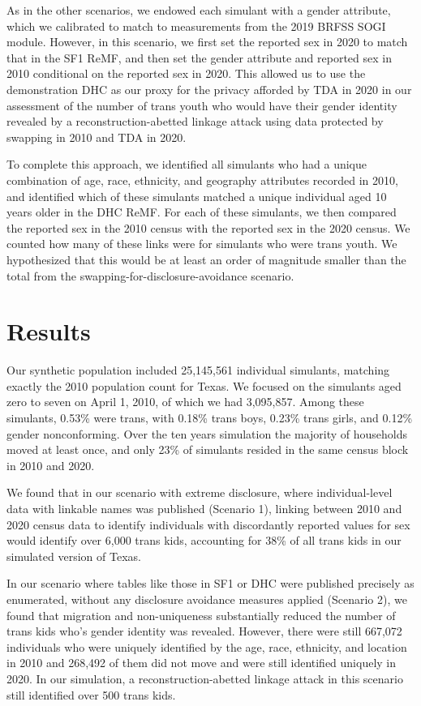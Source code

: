 \documentclass{jpc} %
\theoremstyle{plain}\newtheorem{satz}[thm]{Satz} %
\begin{document}
As in the other scenarios, we endowed each simulant with a gender attribute, which we calibrated to match to measurements from the 2019 BRFSS SOGI module. However, in this scenario, we first set the reported sex in 2020 to match that in the SF1 ReMF, and then set the gender attribute and reported sex in 2010 conditional on the reported sex in 2020.  This allowed us to use the demonstration DHC as our proxy for the privacy afforded by TDA in 2020 in our assessment of the number of trans youth who would have their gender identity revealed by a reconstruction-abetted linkage attack using data protected by swapping in 2010 and TDA in 2020.

To complete this approach, we identified all simulants who had a unique combination of age, race, ethnicity, and geography attributes recorded in 2010, and identified which of these simulants matched a unique individual aged 10 years older in the DHC ReMF.  For each of these simulants, we then compared the reported sex in the 2010 census with the reported sex in the 2020 census. We counted how many of these links were for simulants who were trans youth.  We hypothesized that this would be at least an order of magnitude smaller than the total from the swapping-for-disclosure-avoidance scenario.

\section*{Results}

Our synthetic population included 25,145,561 individual simulants, matching exactly the 2010 population count for Texas.  We focused on the simulants aged zero to seven on April 1, 2010, of which we had 3,095,857.
Among these simulants, 0.53\% were trans, with 0.18\% trans boys, 0.23\% trans girls, and 0.12\% gender nonconforming.
Over the ten years simulation the majority of households moved at least once, and only 23\% of simulants resided in the same census block in 2010 and 2020.

We found that in our scenario with extreme disclosure, where individual-level data with linkable names was published (Scenario 1), linking between 2010 and 2020 census data to identify individuals with discordantly reported values for sex would identify over 6,000 trans kids, accounting for 38\% of all trans kids in our simulated version of Texas.

In our scenario where tables like those in SF1 or DHC were published precisely as enumerated, without any disclosure avoidance measures applied (Scenario 2), we found that migration and non-uniqueness substantially reduced the number of trans kids who's gender identity was revealed.  However, there were still 667,072 individuals who were uniquely identified by the age, race, ethnicity, and location in 2010 and 268,492 of them did not move and were still identified uniquely in 2020.  In our simulation, a reconstruction-abetted linkage attack in this scenario still identified over 500 trans kids.
\end{document}
